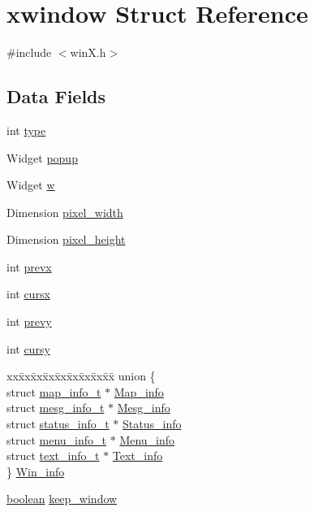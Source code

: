 \hypertarget{structxwindow}{\section{xwindow Struct Reference}
\label{structxwindow}
}


{\ttfamily \#include $<$win\+X.\+h$>$}

\subsection*{Data Fields}
\begin{DoxyCompactItemize}
\item 
int \hyperlink{structxwindow_ae5bcb513f6ce2c64b180514ee0287c23}{type}
\item 
Widget \hyperlink{structxwindow_a87808ea4214ca268f6aa2df79301713e}{popup}
\item 
Widget \hyperlink{structxwindow_a02c943a987ff220921a86f40fc5fdfda}{w}
\item 
Dimension \hyperlink{structxwindow_a8f270ead0a1ab2847febd35c4da5afe6}{pixel\+\_\+width}
\item 
Dimension \hyperlink{structxwindow_aab5493256f7f6baa33fe878ab6c403f5}{pixel\+\_\+height}
\item 
int \hyperlink{structxwindow_ab8c3e2d2d6643622d57d1110837780fe}{prevx}
\item 
int \hyperlink{structxwindow_a065050011feaee6a1bcacbf1bf52ae68}{cursx}
\item 
int \hyperlink{structxwindow_a493627beb90e722882da46ed2227a30e}{prevy}
\item 
int \hyperlink{structxwindow_a3a83f758525fbb15e87bd9e850b41ca5}{cursy}
\item 
\begin{tabbing}
xx\=xx\=xx\=xx\=xx\=xx\=xx\=xx\=xx\=\kill
union \{\\
\>struct \hyperlink{structmap__info__t}{map\_info\_t} $\ast$ \hyperlink{structxwindow_a5ad3075ccdab48dd66499a4feee475b7}{Map\_info}\\
\>struct \hyperlink{structmesg__info__t}{mesg\_info\_t} $\ast$ \hyperlink{structxwindow_a862769ba57e4c91fb372be9748bc406b}{Mesg\_info}\\
\>struct \hyperlink{structstatus__info__t}{status\_info\_t} $\ast$ \hyperlink{structxwindow_a9c2790da311e0b25973a5a59492a1eb5}{Status\_info}\\
\>struct \hyperlink{structmenu__info__t}{menu\_info\_t} $\ast$ \hyperlink{structxwindow_a60b1f8239efbe6ed2ef51f61ddfae6e1}{Menu\_info}\\
\>struct \hyperlink{structtext__info__t}{text\_info\_t} $\ast$ \hyperlink{structxwindow_a31ba56d6138d4ad8bdfc3a1c0ab152cd}{Text\_info}\\
\} \hyperlink{structxwindow_a2bcfbbda61d06c2065b2460506606f64}{Win\_info}\\

\end{tabbing}\item 
\hyperlink{global_8h_a531b10dd351aa162d7dcccd1966308b8}{boolean} \hyperlink{structxwindow_aa386fb9cd6e2a29ee3df76aa4307c401}{keep\+\_\+window}
\end{DoxyCompactItemize}


